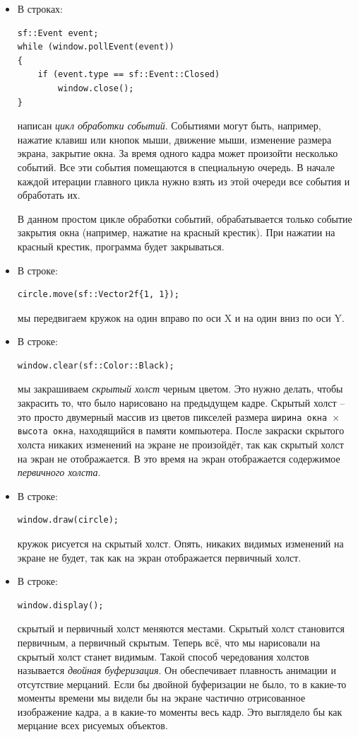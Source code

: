 \documentclass{article}
\begin{document}
\begin{itemize}
\item В строках:
\begin{lstlisting}[frame=none]
sf::Event event;
while (window.pollEvent(event)) 
{
    if (event.type == sf::Event::Closed)
        window.close();
}
\end{lstlisting}
написан \textit{цикл обработки событий}. Событиями могут быть, например, нажатие клавиш или кнопок мыши, движение мыши, изменение размера экрана, закрытие окна. За время одного кадра может произойти несколько событий. Все эти события помещаются в специальную очередь. В начале каждой итерации главного цикла нужно взять из этой очереди все события и обработать их.

В данном простом цикле обработки событий, обрабатывается только событие закрытия окна (например, нажатие на красный крестик). При нажатии на красный крестик, программа будет закрываться.

\item В строке:
\begin{lstlisting}[frame=none]
circle.move(sf::Vector2f{1, 1});
\end{lstlisting}
мы передвигаем кружок на один вправо по оси X и на один вниз по оси Y.

\item В строке:
\begin{lstlisting}[frame=none]
window.clear(sf::Color::Black);
\end{lstlisting}
мы закрашиваем \textit{скрытый холст} черным цветом. Это нужно делать, чтобы закрасить то, что было нарисовано на предыдущем кадре. Скрытый холст -- это просто двумерный массив из цветов пикселей размера \texttt{ширина окна $\times$ высота окна}, находящийся в памяти компьютера. После закраски скрытого холста никаких изменений на экране не произойдёт, так как скрытый холст на экран не отображается. В это время на экран отображается содержимое \textit{первичного холста}.


\item В строке:
\begin{lstlisting}[frame=none]
window.draw(circle);
\end{lstlisting}
кружок рисуется на скрытый холст. Опять, никаких видимых изменений на экране не будет, так как на экран отображается первичный холст.

\item В строке:
\begin{lstlisting}[frame=none]
window.display();
\end{lstlisting}
скрытый и первичный холст меняются местами. Скрытый холст становится первичным, а первичный скрытым. Теперь всё, что мы нарисовали на скрытый холст станет видимым. Такой способ чередования холстов называется \textit{двойная буферизация}. Он обеспечивает плавность анимации и отсутствие мерцаний. Если бы двойной буферизации не было, то в какие-то моменты времени мы видели бы на экране частично отрисованное изображение кадра, а в какие-то моменты весь кадр. Это выглядело бы как мерцание всех рисуемых объектов.
\end{itemize}
\end{document}
